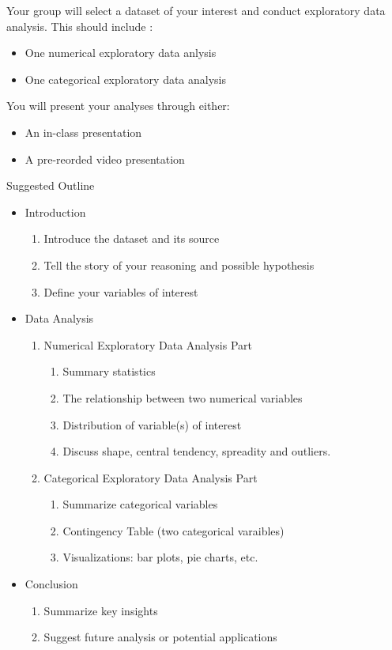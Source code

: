 \documentclass[12pt]{article}
\begin{document}
Your group will select a dataset of your interest and conduct exploratory data analysis.
This should include :
\begin{itemize}
    \item One numerical exploratory data anlysis
    \item One categorical exploratory data analysis 
\end{itemize} 
You will present your analyses through either:
\begin{itemize}
    \item An in-class presentation 
    \item A pre-reorded video presentation
\end{itemize}
Suggested Outline
\begin{itemize}
    \item Introduction
    \begin{enumerate}
        \item Introduce the dataset and its source
        \item Tell the story of your reasoning and possible hypothesis
        \item Define your variables of interest
    \end{enumerate}
    \item Data Analysis
    \begin{enumerate}
        \item Numerical Exploratory Data Analysis Part
        \begin{enumerate}
            \item Summary statistics 
            \item The relationship between two numerical variables 
            \item Distribution of variable(s) of interest
            \item Discuss shape, central tendency, spreadity and outliers. 
        \end{enumerate}
        \item Categorical Exploratory Data Analysis Part
        \begin{enumerate}
            \item Summarize categorical variables
            \item Contingency Table (two categorical varaibles)
            \item Visualizations: bar plots, pie charts, etc.
        \end{enumerate} 
    \end{enumerate}
    \item Conclusion
        \begin{enumerate}
            \item Summarize key insights
            \item Suggest future analysis or potential applications
        \end{enumerate} 
\end{itemize}
\end{document}
